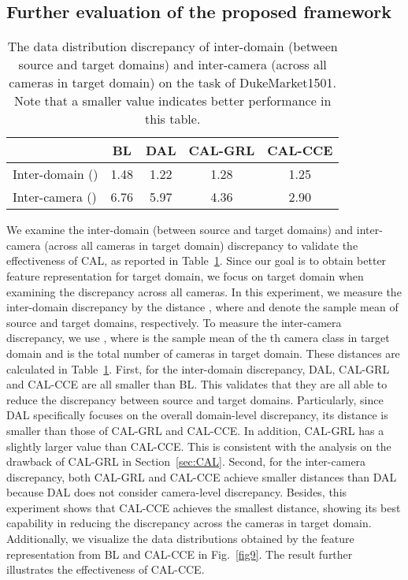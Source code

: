 \documentclass[10pt,twocolumn,letterpaper]{article}
\begin{document}
\subsection{Further evaluation of the proposed framework}\label{sec:EXP-FECAL}


\begin{table}[htbp]
 \centering
 \caption{The data distribution discrepancy of inter-domain (between source and target domains) and inter-camera (across all cameras in target domain) on the task of DukeMarket1501. Note that a smaller value indicates better performance in this table.}
 \begin{adjustbox}{width=0.45\textwidth}
   \begin{tabular}{|l|c|c|c|c|}
   \toprule
         & BL   & DAL  & CAL-GRL & CAL-CCE \\
   \midrule
Inter-domain () & 1.48 & 1.22 & 1.28 & 1.25 \\
   \midrule
Inter-camera () & 6.76 & 5.97 & 4.36 & 2.90 \\
 \midrule
   \end{tabular}\end{adjustbox}
 \label{tab06}\vspace*{-15pt}
\end{table}

 
We examine the inter-domain (between source and target domains) and inter-camera (across all cameras in target domain) discrepancy to validate the effectiveness of CAL, as reported in Table~\ref{tab06}. Since our goal is to obtain better feature representation for target domain, we focus on target domain when examining the discrepancy across all cameras. In this experiment, we measure the inter-domain discrepancy by the distance , where  and  denote the sample mean of source and target domains, respectively. To measure the inter-camera discrepancy, we use , where  is the sample mean of the th camera class in target domain and  is the total number of cameras in target domain. These distances are calculated in Table~\ref{tab06}. First, for the inter-domain discrepancy, DAL, CAL-GRL and CAL-CCE are all smaller than BL. This validates that they are all able to reduce the discrepancy between source and target domains. Particularly, since DAL specifically focuses on the overall domain-level discrepancy, its distance is smaller than those of CAL-GRL and CAL-CCE. In addition, CAL-GRL has a slightly larger value than CAL-CCE. This is consistent with the analysis on the drawback of CAL-GRL in Section~\ref{sec:CAL}. Second, for the inter-camera discrepancy, both CAL-GRL and CAL-CCE achieve smaller distances than DAL because DAL does not consider camera-level discrepancy. Besides, this experiment shows that CAL-CCE achieves the smallest distance, showing its best capability in reducing the discrepancy across the cameras in target domain. Additionally, we visualize the data distributions obtained by the feature representation from BL and CAL-CCE in Fig.~\ref{fig9}. The result further illustrates the effectiveness of CAL-CCE. 
\end{document}
